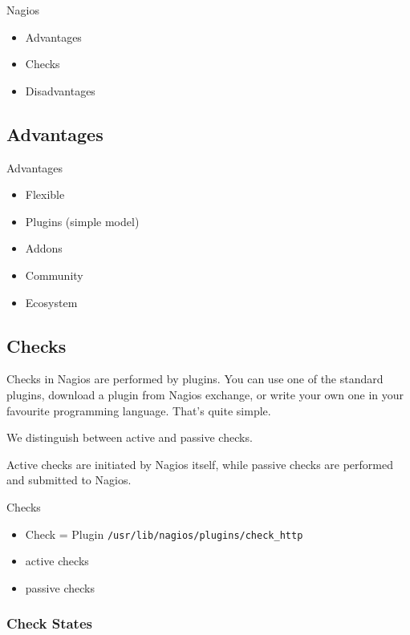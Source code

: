 \begin{frame}[fragile]{Nagios}
\begin{itemize}
\item Advantages
\item Checks
\item Disadvantages
\end{itemize}
\end{frame}

\subsection{Advantages}
\begin{frame}[fragile]{Advantages}
\begin{itemize}
\item Flexible
\item Plugins (simple model)
\item Addons
\item Community
\item Ecosystem
\end{itemize}
\end{frame}

\subsection{Checks}
Checks in Nagios are performed by plugins.
You can use one of the standard plugins, download a plugin
from Nagios exchange, or write your own one in your
favourite programming language. That's quite simple.

We distinguish between active and passive checks.

Active checks are initiated by Nagios itself,
while passive checks are performed and submitted
to Nagios.

\begin{frame}[fragile]{Checks}
\begin{itemize}
\item Check = Plugin
\verb|/usr/lib/nagios/plugins/check_http|
\end{itemize}

\begin{itemize}
\item active checks
\item passive checks
\end{itemize}

\end{frame}

\subsubsection{Check States}

